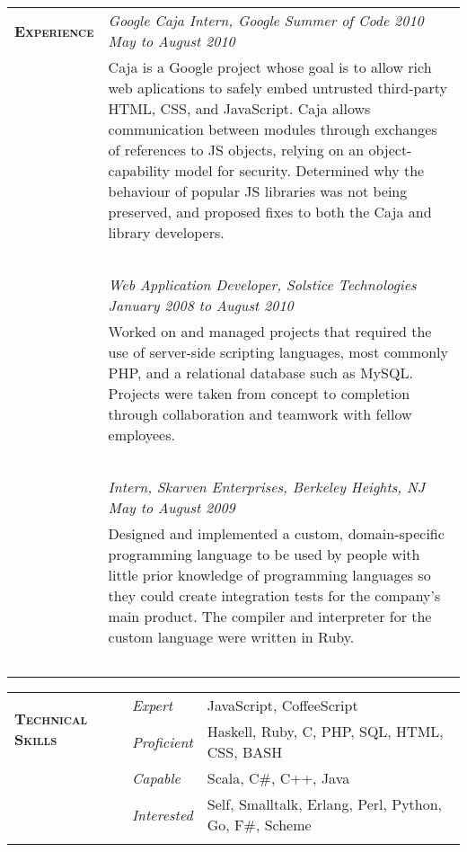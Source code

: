 \documentclass{report}
\newcommand{\sectiontitle}[1]{{\large \textsc{\textbf{#1}}}}
\newcommand{\gutterwidth}[0]{3.3cm}
\newcommand{\extralinespacing}[0]{0.15cm}
\begin{document}
\begin{tabular}{@{}p{\gutterwidth}p{13cm}@{}}
  \sectiontitle{Experience}
      &  {\em Google Caja Intern, Google Summer of Code 2010 \hfill May to August 2010} \\
  {}  &  Caja is a Google project whose goal is to allow rich web aplications to safely embed untrusted third-party
  HTML, CSS, and JavaScript. Caja allows communication between modules through exchanges of references to JS
  objects, relying on an object-capability model for security. Determined why the behaviour of popular JS libraries
  was not being preserved, and proposed fixes to both the Caja and library developers.
  \\~\\
  {}  &  {\em Web Application Developer, Solstice Technologies \hfill January 2008 to August 2010} \\
  {}  &  Worked on and managed projects that required the use of server-side scripting languages, most commonly PHP, and
  a relational database such as MySQL\@. Projects were taken from concept to completion through collaboration and teamwork
  with fellow employees.
  \\~\\
  {}  &  {\em Intern, Skarven Enterprises, Berkeley Heights, NJ \hfill May to August 2009} \\
  {}  &  Designed and implemented a custom, domain-specific programming language to be used by people with little prior
  knowledge of programming languages so they could create integration tests for the company's main product. The compiler
  and interpreter for the custom language were written in Ruby.
  \\~\\
\end{tabular}

\begin{tabular}{@{}p{\gutterwidth}p{1.5cm}p{11.5cm}@{}}
  \multirow{2}{\gutterwidth}{\sectiontitle{Technical Skills}}
      &  {\em Expert}      &  JavaScript, CoffeeScript \\[\extralinespacing]
  {}  &  {\em Proficient}  &  Haskell, Ruby, C, PHP, SQL, HTML, CSS, BASH \\[\extralinespacing]
  {}  &  {\em Capable}     &  Scala, C\#, C++, Java \\[\extralinespacing]
  {}  &  {\em Interested}  &  Self, Smalltalk, Erlang, Perl, Python, Go, F\#, Scheme \\
  \\
\end{tabular}
\end{document}
